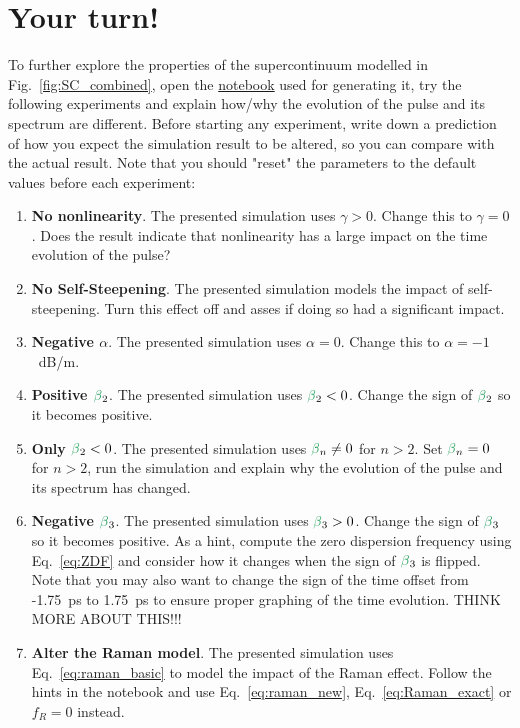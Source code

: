\section{Your turn!}
To further explore the properties of the supercontinuum modelled in Fig.~\ref{fig:SC_combined}, open the \href{https://colab.research.google.com/drive/1HvA8F8yzEq-9fahuI4z2KhT-YhdRAXgt?usp=sharing}{notebook} used for generating it, try the following experiments and explain how/why the evolution of the pulse and its spectrum are different. Before starting any experiment, write down a prediction of how you expect the simulation result to be altered, so you can compare with the actual result. Note that you should "reset" the parameters to the default values before each experiment:

\begin{enumerate}

\item \textbf{No nonlinearity}. The presented simulation uses $\gamma>0$. Change this to $\gamma=0$. Does the result indicate that nonlinearity has a large impact on the time evolution of the pulse?

\item \textbf{No Self-Steepening}. The presented simulation models the impact of self-steepening. Turn this effect off and asses if doing so had a significant impact.

\item \textbf{Negative $\alpha$}. The presented simulation uses $\alpha=0$. Change this to $\alpha=-1$~dB/m. 



\item \textbf{Positive $\betag_2$}. The presented simulation uses $\betag_2<0$. Change the sign of $\betag_2$ so it becomes positive. 



\item \textbf{Only $\betag_2<0$}. The presented simulation uses $\betag_n\neq0$ for $n>2$. Set $\betag_n = 0$ for $n>2$, run the simulation and explain why the evolution of the pulse and its spectrum has changed. 

\item \textbf{Negative $\betag_3$}. The presented simulation uses $\betag_3>0$. Change the sign of $\betag_3$ so it becomes positive. As a hint, compute the zero dispersion frequency using Eq.~\ref{eq:ZDF} and consider how it changes when the sign of $\betag_3$ is flipped. Note that you may also want to change the sign of the time offset from -1.75~ps to 1.75~ps to ensure proper graphing of the time evolution. THINK MORE ABOUT THIS!!!  


\item \textbf{Alter the Raman model}. The presented simulation uses Eq.~\ref{eq:raman_basic} to model the impact of the Raman effect. Follow the hints in the notebook and use Eq.~\ref{eq:raman_new}, Eq.~\ref{eq:Raman_exact} or $f_R=0$ instead.  
\end{enumerate}